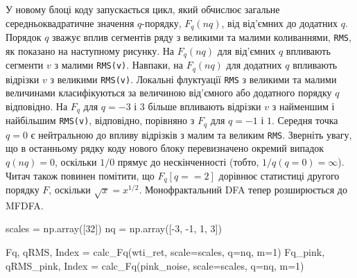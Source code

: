 \documentclass[
  letterpaper,
]{report}
\newenvironment{Shaded}{\begin{snugshade}}{\end{snugshade}}
\newcommand{\DecValTok}[1]{\textcolor[rgb]{0.68,0.00,0.00}{#1}}
\newcommand{\NormalTok}[1]{\textcolor[rgb]{0.00,0.23,0.31}{#1}}
\newcommand{\OperatorTok}[1]{\textcolor[rgb]{0.37,0.37,0.37}{#1}}
\begin{document}
У новому блоці коду запускається цикл, який обчислює загальне
середньоквадратичне значення \(q\)-порядку, \(F_{q}(nq)\), від від'ємних
до додатних \(q\). Порядок \(q\) зважує вплив сегментів ряду з великими
та малими коливаннями, \texttt{RMS}, як показано на наступному рисунку.
На \(F_{q}(nq)\) для від'ємних \(q\) впливають сегменти \(v\) з малими
\texttt{RMS(v)}. Навпаки, на \(F_{q}(nq)\) для додатних \(q\) впливають
відрізки \(v\) з великими \texttt{RMS(v)}. Локальні флуктуації
\texttt{RMS} з великими та малими величинами класифікуються за величиною
від'ємного або додатного порядку \(q\) відповідно. На \(F_{q}\) для
\(q = -3\) і \(3\) більше впливають відрізки \(v\) з найменшим і
найбільшим \texttt{RMS(v)}, відповідно, порівняно з \(F_{q}\) для
\(q = -1\) і \(1\). Середня точка \(q = 0\) є нейтральною до впливу
відрізків з малим та великим \texttt{RMS}. Зверніть увагу, що в
останньому рядку коду нового блоку перевизначено окремий випадок
\(q(nq) = 0\), оскільки \(1/0\) прямує до нескінченності (тобто,
\(1/q(q = 0) = \infty\)). Читач також повинен помітити, що
\(F_{q}[q == 2]\) дорівнює статистиці другого порядку \(F\), оскільки
\(\sqrt{x} = x^{1/2}\). Монофрактальний DFA тепер розширюється до MFDFA.

\begin{Shaded}
\begin{Highlighting}[]
\NormalTok{scales }\OperatorTok{=}\NormalTok{ np.array([}\DecValTok{32}\NormalTok{])}
\NormalTok{nq }\OperatorTok{=}\NormalTok{ np.array([}\OperatorTok{{-}}\DecValTok{3}\NormalTok{, }\OperatorTok{{-}}\DecValTok{1}\NormalTok{, }\DecValTok{1}\NormalTok{, }\DecValTok{3}\NormalTok{])}

\NormalTok{Fq, qRMS, Index }\OperatorTok{=}\NormalTok{ calc\_Fq(wti\_ret, scale}\OperatorTok{=}\NormalTok{scales, q}\OperatorTok{=}\NormalTok{nq, m}\OperatorTok{=}\DecValTok{1}\NormalTok{)}
\NormalTok{Fq\_pink, qRMS\_pink, Index }\OperatorTok{=}\NormalTok{ calc\_Fq(pink\_noise, scale}\OperatorTok{=}\NormalTok{scales, q}\OperatorTok{=}\NormalTok{nq, m}\OperatorTok{=}\DecValTok{1}\NormalTok{)}
\end{Highlighting}
\end{Shaded}
\end{document}
